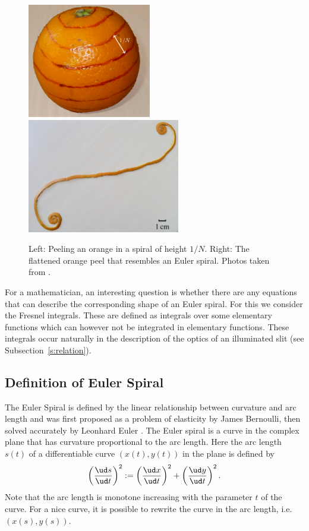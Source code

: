 \documentclass[12pt]{article}
\newcommand\udfrac[2]{\ensuremath{\frac{\ud#1}{\ud #2}}}
\begin{document}
\begin{figure}[h!]
	\centering
	\includegraphics[height=5cm]{orange.jpg} \hfill
	\includegraphics[height=5cm]{orangePeel.jpg}
	\label{f:orangePeel}
	\caption{Left: Peeling an orange in a spiral of height $1/N$.
		Right: The flattened orange peel that resembles an Euler spiral.  Photos taken from \cite{BH12}.
	}
\end{figure}

For a mathematician, an interesting question is whether there are any equations that can describe the corresponding shape of an Euler spiral. For this we consider the Fresnel integrals.  These are defined as integrals over some elementary functions which can however not be integrated in elementary functions.  These integrals occur naturally in the description of the optics of an illuminated slit (see Subsection~\ref{s:relation}).


\subsection{Definition of Euler Spiral}
The Euler Spiral is defined by the  linear relationship between curvature and arc length and was
first proposed as a problem of elasticity by James Bernoulli, then solved accurately by Leonhard Euler \cite{Lev08}.
The Euler spiral is a curve in the complex plane that has curvature proportional to the arc length.  Here the arc length $s(t)$ of a differentiable curve $(x(t),y(t))$ in the plane is defined by
\[  \left(\udfrac{s}{t}\right)^2 := \left(\udfrac{x}{t}\right)^2 +\left(\udfrac{y}{t}\right)^2.
\]  Note that the arc length is monotone increasing with the parameter $t$ of the curve.  For a nice curve, it is possible to rewrite the curve in the arc length, i.e.~$(x(s),y(s))$.
\end{document}
